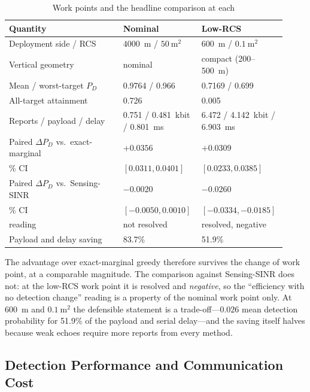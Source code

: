 \begin{table}[!t]
	\centering
	\caption{Work points and the headline comparison at each}
	\label{tab:work_points}
	\footnotesize
	\setlength{\tabcolsep}{3pt}
	\begin{tabular}{@{}p{0.40\linewidth}p{0.26\linewidth}p{0.26\linewidth}@{}}
		\toprule
		Quantity & Nominal & Low-RCS \\
		\midrule
		Deployment side / RCS & $4000$~m / $50~\mathrm m^2$
			& $600$~m / $0.1~\mathrm m^2$ \\
		Vertical geometry & nominal & compact (200--500~m) \\
		Mean / worst-target $P_D$ & 0.9764 / 0.966 & 0.7169 / 0.699 \\
		All-target attainment & 0.726 & 0.005 \\
		Reports / payload / delay & 0.751 / 0.481~kbit / 0.801~ms
			& 6.472 / 4.142~kbit / 6.903~ms \\
		Paired $\Delta P_D$ vs.\ exact-marginal & $+0.0356$
			& $+0.0309$ \\
		\quad 95\% CI & $[0.0311, 0.0401]$ & $[0.0233, 0.0385]$ \\
		Paired $\Delta P_D$ vs.\ Sensing-SINR & $-0.0020$ & $-0.0260$ \\
		\quad 95\% CI & $[-0.0050, 0.0010]$ & $[-0.0334, -0.0185]$ \\
		\quad reading & not resolved & resolved, negative \\
		Payload and delay saving & 83.7\% & 51.9\% \\
		\bottomrule
	\end{tabular}
\end{table}

The advantage over exact-marginal greedy therefore survives the change of work
point, at a comparable magnitude. The comparison against Sensing-SINR does not:
at the low-RCS work point it is resolved and \emph{negative}, so the
``efficiency with no detection change'' reading is a property of the nominal work
point only. At 600~m and $0.1~\mathrm m^2$ the defensible statement is a
trade-off---$0.026$ mean detection probability for 51.9\% of the payload and
serial delay---and the saving itself halves because weak echoes require more
reports from every method.

\subsection{Detection Performance and Communication Cost}

